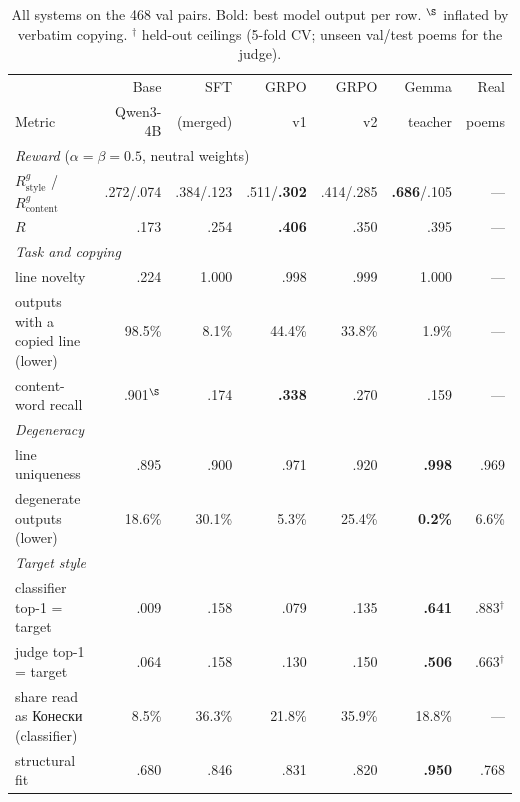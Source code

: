 \documentclass[11pt]{article}
\begin{document}
\begin{table}[ht]
\centering\small
\begin{tabular}{lrrrrrr}
\toprule
& Base & SFT & GRPO & GRPO & Gemma & Real \\
Metric & Qwen3-4B & (merged) & v1 & v2 & teacher & poems \\
\midrule
\multicolumn{7}{l}{\emph{Reward} ($\alpha=\beta=0.5$, neutral weights)} \\
\quad $R^{g}_{\mathrm{style}}$ / $R^{g}_{\mathrm{content}}$ & .272/.074 & .384/.123 & .511/\textbf{.302} & .414/.285 & \textbf{.686}/.105 & --- \\
\quad $R$                                   & .173 & .254 & \textbf{.406} & .350 & .395 & --- \\
\midrule
\multicolumn{7}{l}{\emph{Task and copying}} \\
\quad line novelty                          & .224 & 1.000 & .998 & .999 & 1.000 & --- \\
\quad outputs with a copied line (lower)    & 98.5\% & 8.1\% & 44.4\% & 33.8\% & 1.9\% & --- \\
\quad content-word recall                   & .901$^\S$ & .174 & \textbf{.338} & .270 & .159 & --- \\
\midrule
\multicolumn{7}{l}{\emph{Degeneracy}} \\
\quad line uniqueness                       & .895 & .900 & .971 & .920 & \textbf{.998} & .969 \\
\quad degenerate outputs (lower)            & 18.6\% & 30.1\% & 5.3\% & 25.4\% & \textbf{0.2\%} & 6.6\% \\
\midrule
\multicolumn{7}{l}{\emph{Target style}} \\
\quad classifier top-1 = target             & .009 & .158 & .079 & .135 & \textbf{.641} & .883$^\dagger$ \\
\quad judge top-1 = target                  & .064 & .158 & .130 & .150 & \textbf{.506} & .663$^\dagger$ \\
\quad share read as Конески (classifier)    & 8.5\% & 36.3\% & 21.8\% & 35.9\% & 18.8\% & --- \\
\quad structural fit                        & .680 & .846 & .831 & .820 & \textbf{.950} & .768 \\
\bottomrule
\end{tabular}
\caption{All systems on the 468 val pairs. Bold: best model output per row.
$^\S$ inflated by verbatim copying. $^\dagger$ held-out ceilings (5-fold CV;
unseen val/test poems for the judge).}
\label{tab:main}
\end{table}
\end{document}
